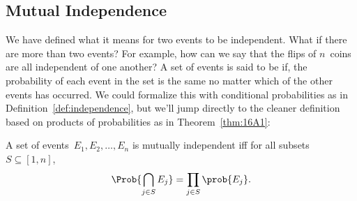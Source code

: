 \subsection{Mutual Independence}


We have defined what it means for two events to be independent.  What
if there are more than two events?  For example, how can we say that
the flips of $n$~coins are all independent of one another?  A set of
events is said to be  if, the probability
of each event in the set is the same no matter which of the other
events has occurred.  We could formalize this with conditional
probabilities as in Definition~\ref{def:independence}, but we'll jump
directly to the cleaner definition based on products of probabilities
as in Theorem~\ref{thm:16A1}:

\iffalse

\begin{definition}\label{def:mutual_independence}
A set of events~$E_1, E_2, \dots, E_n$, is \term{mutually independent}
if $\forall i \in [1, n]$ and $\forall S \subseteq [1, n] - \set{i}$,
either
\begin{equation*}
    \Prob{\bigcap_{j \in S} E_j} = 0
\quad
\text{or}
\quad
    \prob{E_i} = \prcond{E_i}{\bigcap_{j \in S} E_j}.
\end{equation*}
\end{definition}

\subsection{Alternative Formulation}

Just as Theorem~\ref{thm:16A1} provided an alternative definition of
independence for two events, there is an alternative definition for
mutual independence.

\fi


\begin{definition}\label{def:mutual_indep}
A set of events~$E_1, E_2, \dots, E_n$ is mutually independent iff
for all subsets $S \subseteq [1, n]$,
\begin{equation*}
    \Prob{\bigcap_{j \in S} E_j} = \prod_{j \in S} \prob{E_j}.
\end{equation*}
\end{definition}

